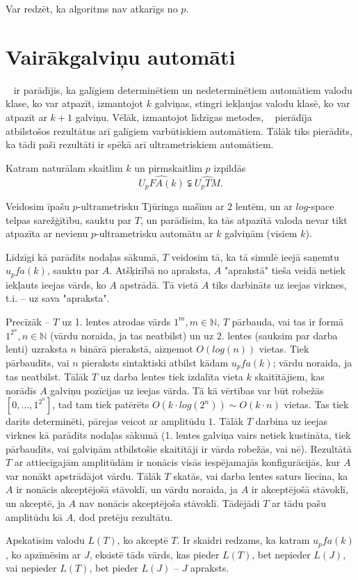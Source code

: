 \documentclass{ludis}
\begin{document}
\begin{pieradijums}
Var redzēt, ka algoritms nav atkarīgs no $p$.
\end{pieradijums}

\section{Vairākgalviņu automāti}
~\citet{Monien1980} ir parādījis, ka galīgiem determinētiem un nedeterminētiem automātiem valodu klase, ko var atpazīt, izmantojot $k$ galviņas, stingri iekļaujas valodu klasē, ko var atpazīt ar $k+1$ galviņu. Vēlāk, izmantojot līdzīgas metodes, ~\citet{Macarie1995} pierādīja atbilstošos rezultātus arī galīgiem varbūtiskiem automātiem. Tālāk tiks pierādīts, ka tādi paši rezultāti ir spēkā arī ultrametriskiem automātiem.

\begin{teorema} \label{atdalisana}
Katram naturālam skaitlim $k$ un pirmskaitlim $p$ izpildās
\[
	\widehat{U_pFA(k)} \subsetneqq \widehat{U_pTM}.
\]
\end{teorema}
\begin{pieradijums}
Veidosim īpašu $p$-ultrametrisku Tjūringa mašīnu ar $2$ lentēm, un ar $log$-space telpas sarežģītību, sauktu par $T$, un parādīsim, ka tās atpazītā valoda nevar tikt atpazīta ar nevienu $p$-ultrametrisku automātu ar $k$ galviņām (visiem $k$).

Līdzīgi kā parādīts nodaļas sākumā, $T$ veidosim tā, ka tā simulē ieejā saņemtu $u_pfa(k)$, sauktu par $A$. Atšķirībā no apraksta, $A$ "aprakstā" tieša veidā netiek iekļauts ieejas vārds, ko $A$ apstrādā. Tā vietā $A$ tiks darbināts uz ieejas virknes, t.i. -- uz sava "apraksta".

Precīzāk -- $T$ uz 1. lentes atrodas vārds $1^m, m \in \mathbb{N}$, $T$ pārbauda, vai tas ir formā $1^{2^n}, n \in \mathbb{N}$ (vārdu noraida, ja tas neatbilst) un uz 2. lentes (sauksim par darba lenti) uzraksta $n$ binārā pierakstā, aizņemot $O(log(n))$ vietas. Tiek pārbaudīts, vai $n$ pieraksts sintaktiski atbilst kādam $u_pfa(k)$; vārdu noraida, ja tas neatbilst. Tālāk $T$ uz darba lentes tiek izdalīta vieta $k$ skaitītājiem, kas norādīs $A$ galviņu pozīcijas uz ieejas vārda. Tā kā vērtības var būt robežās $\left[0, \ldots, 1^{2^n} \right]$, tad tam tiek patērēts $O(k \cdot log(2^n)) \sim O(k \cdot n)$ vietas. %
Tas tiek darīts determinēti, pārejas veicot ar amplitūdu $1$. Tālāk $T$ darbina uz ieejas virknes kā parādīts nodaļas sākumā (1. lentes galviņa vairs netiek kustināta, tiek pārbaudīts, vai galviņām atbilstošie skaitītāji ir vārda robežās, vai nē). Rezultātā $T$ ar attiecīgajām amplitūdām ir nonācis visās iespējamajās konfigurācijās, kur $A$ var nonākt apstrādājot vārdu. Tālāk $T$ skatās, vai darba lentes saturs liecina, ka $A$ ir nonācis akceptējošā stāvoklī, un vārdu noraida, ja $A$ ir akceptējošā stāvoklī, un akceptē, ja $A$ nav nonācis akceptējoša stāvoklī. Tādējādi $T$ ar tādu pašu amplitūdu kā $A$, dod pretēju rezultātu.

Apskatīsim valodu $L(T)$, ko akceptē $T$. Ir skaidri redzams, ka katram $u_pfa(k)$, ko apzīmēsim ar $J$, eksistē tāds vārds, kas pieder $L(T)$, bet nepieder $L(J)$, vai nepieder $L(T)$, bet pieder $L(J)$ -- $J$ apraksts.
\end{pieradijums}
\end{document}
